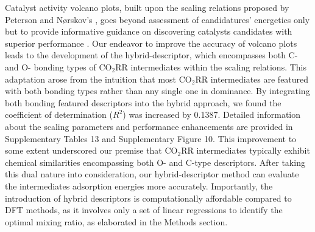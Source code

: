Catalyst activity volcano plots, built upon the scaling relations proposed by Peterson and Nørskov's \cite{peterson2012activity},
goes beyond assessment of candidatures' energetics only but to provide informative guidance on discovering catalysts candidates with superior performance \cite{balandin1969modern, deutschmann2000heterogeneous}.
Our endeavor to improve the accuracy of volcano plots leads to the development of the hybrid-descriptor,
which encompasses both C- and O- bonding types of CO$_2$RR intermediates within the scaling relations.
This adaptation arose from the intuition that most CO$_2$RR intermediates are featured with both bonding types rather than any single one in dominance.
By integrating both bonding featured descriptors into the hybrid approach, we found the coefficient of determination ($R^2$) was increased by 0.1387.
Detailed information about the scaling parameters and performance enhancements are provided in Supplementary Tables 13 and Supplementary Figure 10.
This improvement to some extent underscored our premise that CO$_2$RR intermediates typically exhibit chemical similarities encompassing both O- and C-type descriptors.
After taking this dual nature into consideration, our hybrid-descriptor method can evaluate the intermediates adsorption energies more accurately.
Importantly, the introduction of hybrid descriptors is computationally affordable compared to DFT methods,
as it involves only a set of linear regressions to identify the optimal mixing ratio, as elaborated in the Methods section.

